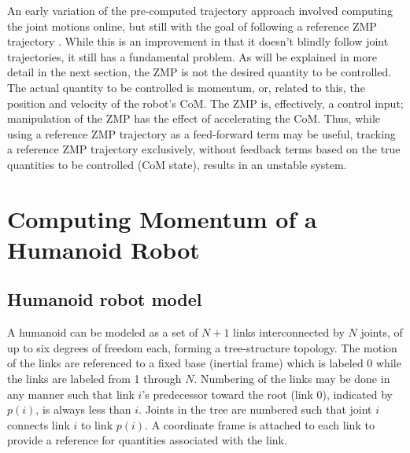 \documentclass{llncs}
\begin{document}
An early variation of the pre-computed trajectory approach involved computing the joint motions 
online, but still with the goal of following a reference ZMP trajectory \cite{nishiwaki2002online, 
kagami2002fast, sugihar2002real}.  
While this is an improvement in that it doesn't blindly follow
joint trajectories, it still has a fundamental problem.
As will be explained in more detail in the next section, the ZMP is not the desired quantity to be
controlled. 
The actual quantity to be controlled is momentum, or, related to this, the position and velocity of the 
robot's CoM.
The ZMP is, effectively, a control input;  manipulation of the ZMP has the effect of accelerating the CoM.
Thus, while using a reference ZMP trajectory as a feed-forward term may be useful,
tracking a reference ZMP trajectory exclusively, without feedback terms based on the true
quantities to be controlled (CoM state), results in an unstable system.



\section{Computing Momentum of a Humanoid Robot}
\label{sec:ComputingMomentum}


\subsection{Humanoid robot model}
\label{sn}

A humanoid can be modeled as a set of $N+1$ links interconnected by $N$ joints,
of up to six degrees of freedom each, forming a tree-structure topology.
The motion of the links are referenced to a fixed base (inertial frame)
which is labeled 0 while the links are labeled from 1 through $N$.
Numbering of the links may be done in any manner such that link $i$'s
predecessor toward the root (link 0), indicated by $p(i)$, is always
less than $i$.  Joints in the tree are numbered such that joint $i$
connects link $i$ to link $p(i)$.  A coordinate frame is attached to each
link to provide a reference for quantities associated with the link.
\end{document}
